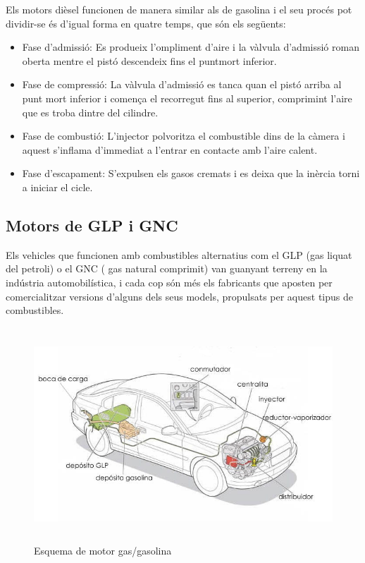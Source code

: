 Els motors dièsel funcionen de manera similar als de gasolina i el \newline seu  procés pot dividir-se és d’igual forma en quatre temps, que són els següents:

\begin{itemize}
 		\item Fase d’admissió: Es produeix l'ompliment d’aire i la vàlvula \newline d’admissió roman oberta mentre el pistó descendeix fins el punt\newline mort inferior.
  		\item Fase de compressió: La vàlvula d’admissió es tanca quan el pistó arriba al punt mort inferior i comença el recorregut fins al superior, comprimint l’aire que es troba dintre del cilindre.
  		\item Fase de combustió: L’injector polvoritza el combustible dins de \newline la  càmera i aquest s’inflama d’immediat a l’entrar en contacte amb \newline l’aire  calent.
  		\item Fase d’escapament: S’expulsen els gasos cremats i es deixa que la inèrcia torni a iniciar el cicle.
\end{itemize}

\subsection{Motors de GLP i GNC}
Els vehicles que funcionen amb combustibles alternatius com el GLP (gas liquat del petroli) o el GNC ( gas natural comprimit) van guanyant terreny en la indústria automobilística, i cada cop són més els fabricants que aposten per comercialitzar versions d’alguns dels seus models, propulsats per aquest tipus de combustibles.

\begin{figure}[H]
		\centering
    	\includegraphics[width=\textwidth, height=8cm]{Motors/motorgnc.jpg}
     	\caption{Esquema de motor gas/gasolina} 
\end{figure}

